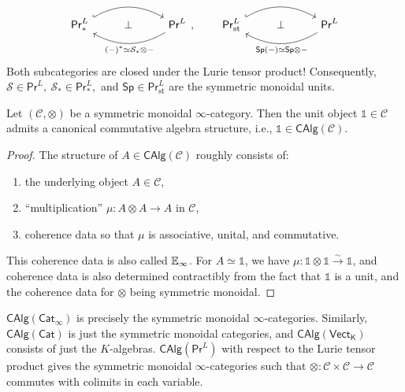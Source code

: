 \begin{example}
    \[
    \begin{tikzcd}
\mathsf{Pr}^L_* \arrow[rr, hook, bend left] & \perp & \mathsf{Pr}^L \arrow[ll, "(-)^*\simeq \mathcal S_*\otimes -", bend left]
\end{tikzcd},\qquad
\begin{tikzcd}
\mathsf{Pr}^L_{\mathrm{st}} \arrow[rr, hook, bend left] & \perp & \mathsf{Pr}^L \arrow[ll, "\mathsf{Sp}(-)\simeq \mathsf{ Sp}\otimes -", bend left]
\end{tikzcd}
    \] 
    Both subcategories are closed under the Lurie tensor product! Consequently, $\mathcal{S} \in \mathsf{Pr} ^L,\ \mathcal{S}_* \in \mathsf{Pr} ^L_*,$ and $\mathsf{Sp} \in \mathsf{Pr} ^L_{\mathrm{st}}$ are the symmetric monoidal units.
\end{example}
\begin{lemma}\label{calg} 
    Let $(\mathcal{C} ,\otimes )$ be a symmetric monoidal $\infty$-category. Then the unit object $\mathbb 1 \in \mathcal{C} $ admits a canonical commutative algebra structure, i.e., $\mathbb 1 \in  \mathsf{CAlg} (\mathcal{C} )$.
\end{lemma}
\begin{proof}
    The structure of $A \in \mathsf{CAlg} (\mathcal{C} )$ roughly consists of:
    \begin{enumerate}[label=(\roman*)]
    \setlength\itemsep{-.2em}
        \item the underlying object $A \in \mathcal{C} $,
        \item ``multiplication'' $\mu \colon A \otimes A \to A$ in $\mathcal{C} $,
        \item coherence data so that $\mu$ is associative, unital, and commutative.
    \end{enumerate}This coherence data is also called $\mathbb{E}_{\infty}$. For $A \simeq \mathbb 1$, we have $\mu \colon \mathbb 1\otimes \mathbb 1 \xrightarrow{\sim} \mathbb 1$, and coherence data is also determined contractibly from the fact that $\mathbb 1$ is a unit, and the coherence data for $\otimes$ being symmetric monoidal.
\end{proof}
\begin{example}
    $\mathsf{CAlg} (\mathsf{Cat} _{\infty})$ is precisely the symmetric monoidal $\infty$-categories. Similarly, $\mathsf{CAlg}(\mathsf{Cat} ) $ is just the symmetric monoidal categories, and $\mathsf{CAlg} (\mathsf{Vect_K} )$ consists of just the $K$-algebras. $\mathsf{CAlg} (\mathsf{Pr} ^L)$ with respect to the Lurie tensor product gives the symmetric monoidal $\infty$-categories such that $\otimes \colon \mathcal{C} \times \mathcal{C} \to  \mathcal{C} $ commutes with colimits in each variable.
\end{example}

